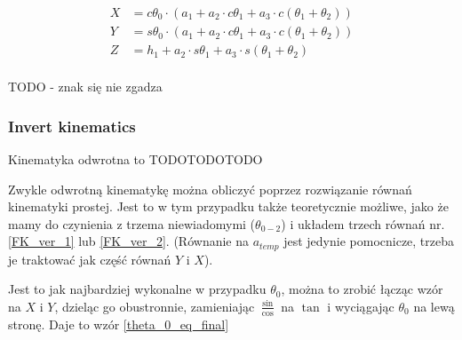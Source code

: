 \documentclass[a4paper,13pt]{article}
\begin{document}
\begin{equation} \label{FK_ver_2}
\begin{split}
X &= c\theta_0 \cdot \left( a_1 + a_2 \cdot c\theta_1 + a_3  \cdot c\left( \theta_1 + \theta_2 \right) \right)\\
Y &= s\theta_0 \cdot \left( a_1 + a_2 \cdot c\theta_1 + a_3  \cdot c\left( \theta_1 + \theta_2 \right) \right)\\
Z &= h_1 + a_2 \cdot s\theta_1 + a_3 \cdot s\left( \theta_1 + \theta_2 \right)\\
\end{split}
\end{equation}

TODO - znak się nie zgadza


\subsubsection{Invert kinematics}
Kinematyka odwrotna to TODOTODOTODO

Zwykle odwrotną kinematykę można obliczyć poprzez rozwiązanie równań kinematyki prostej. Jest to w tym przypadku także teoretycznie możliwe, jako że mamy do czynienia z trzema niewiadomymi ($\theta_{0-2}$) i układem trzech równań nr. \ref{FK_ver_1} lub \ref{FK_ver_2}. (Równanie na $a_{temp}$ jest jedynie pomocnicze, trzeba je traktować jak część równań $Y$ i $X$).

Jest to jak najbardziej wykonalne w przypadku $\theta_0$, można to zrobić łącząc wzór na $X$ i $Y$, dzieląc go obustronnie, zamieniając $\frac{\sin}{\cos}$ na $\tan$ i wyciągając $\theta_0$ na lewą stronę. Daje to wzór \ref{theta_0_eq_final}


\end{document}

